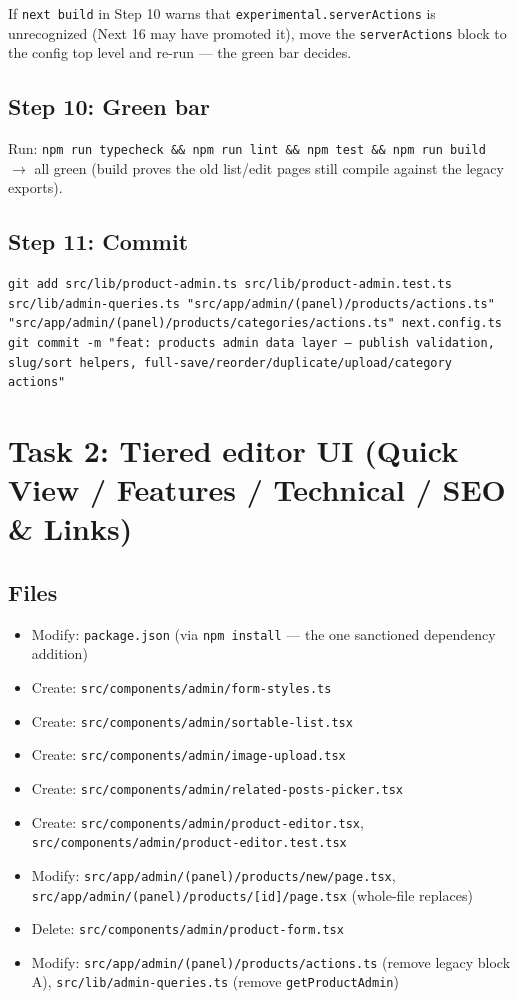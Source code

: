 \documentclass[11pt,a4paper]{article}
\begin{document}
If \texttt{next build} in Step 10 warns that \texttt{experimental.serverActions} is unrecognized (Next
16 may have promoted it), move the \texttt{serverActions} block to the config top level and re-run ---
the green bar decides.

\subsection*{Step 10: Green bar}

Run: \texttt{npm run typecheck \&\& npm run lint \&\& npm test \&\& npm run build} $\rightarrow$ all
green (build proves the old list/edit pages still compile against the legacy exports).

\subsection*{Step 11: Commit}

\begin{lstlisting}
git add src/lib/product-admin.ts src/lib/product-admin.test.ts src/lib/admin-queries.ts "src/app/admin/(panel)/products/actions.ts" "src/app/admin/(panel)/products/categories/actions.ts" next.config.ts
git commit -m "feat: products admin data layer — publish validation, slug/sort helpers, full-save/reorder/duplicate/upload/category actions"
\end{lstlisting}

\section{Task 2: Tiered editor UI (Quick View / Features / Technical / SEO \& Links)}

\subsection*{Files}
\begin{itemize}
  \item Modify: \texttt{package.json} (via \texttt{npm install} --- the one sanctioned dependency
        addition)
  \item Create: \texttt{src/components/admin/form-styles.ts}
  \item Create: \texttt{src/components/admin/sortable-list.tsx}
  \item Create: \texttt{src/components/admin/image-upload.tsx}
  \item Create: \texttt{src/components/admin/related-posts-picker.tsx}
  \item Create: \texttt{src/components/admin/product-editor.tsx},
        \texttt{src/components/admin/product-editor.test.tsx}
  \item Modify: \texttt{src/app/admin/(panel)/products/new/page.tsx},
        \texttt{src/app/admin/(panel)/products/[id]/page.tsx} (whole-file replaces)
  \item Delete: \texttt{src/components/admin/product-form.tsx}
  \item Modify: \texttt{src/app/admin/(panel)/products/actions.ts} (remove legacy block A),
        \texttt{src/lib/admin-queries.ts} (remove \texttt{getProductAdmin})
\end{itemize}
\end{document}
